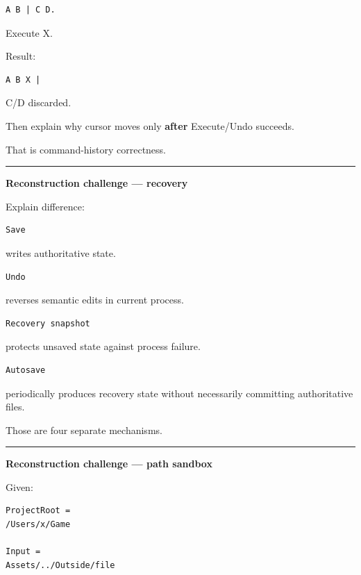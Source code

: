 \begin{verbatim}
A B | C D.
\end{verbatim}

Execute X.

Result:

\begin{verbatim}
A B X |
\end{verbatim}

C/D discarded.

Then explain why cursor moves only \textbf{after} Execute/Undo succeeds.

That is command-history correctness.

\begin{center}\rule{0.5\linewidth}{0.5pt}\end{center}

\textbf{Reconstruction challenge --- recovery}

Explain difference:

\begin{verbatim}
Save
\end{verbatim}

writes authoritative state.

\begin{verbatim}
Undo
\end{verbatim}

reverses semantic edits in current process.

\begin{verbatim}
Recovery snapshot
\end{verbatim}

protects unsaved state against process failure.

\begin{verbatim}
Autosave
\end{verbatim}

periodically produces recovery state without necessarily committing authoritative files.

Those are four separate mechanisms.

\begin{center}\rule{0.5\linewidth}{0.5pt}\end{center}

\textbf{Reconstruction challenge --- path sandbox}

Given:

\begin{verbatim}
ProjectRoot =
/Users/x/Game

Input =
Assets/../Outside/file
\end{verbatim}

